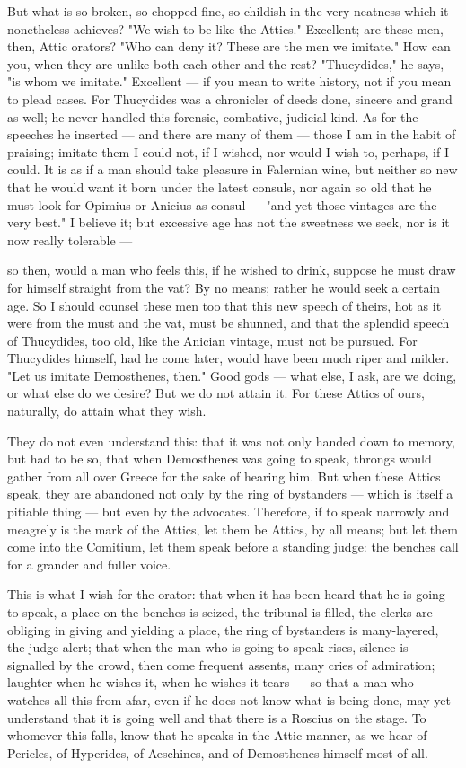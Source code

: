  But what is so broken, so chopped fine, so childish in the very neatness which it nonetheless achieves? "We wish to be like the Attics." Excellent; are these men, then, Attic orators? "Who can deny it? These are the men we imitate." How can you, when they are unlike both each other and the rest? "Thucydides," he says, "is whom we imitate." Excellent — if you mean to write history, not if you mean to plead cases. For Thucydides was a chronicler of deeds done, sincere and grand as well; he never handled this forensic, combative, judicial kind. As for the speeches he inserted — and there are many of them — those I am in the habit of praising; imitate them I could not, if I wished, nor would I wish to, perhaps, if I could. It is as if a man should take pleasure in Falernian wine, but neither so new that he would want it born under the latest consuls, nor again so old that he must look for Opimius or Anicius as consul — "and yet those vintages are the very best." I believe it; but excessive age has not the sweetness we seek, nor is it now really tolerable —

 so then, would a man who feels this, if he wished to drink, suppose he must draw for himself straight from the vat? By no means; rather he would seek a certain age. So I should counsel these men too that this new speech of theirs, hot as it were from the must and the vat, must be shunned, and that the splendid speech of Thucydides, too old, like the Anician vintage, must not be pursued. For Thucydides himself, had he come later, would have been much riper and milder. "Let us imitate Demosthenes, then." Good gods — what else, I ask, are we doing, or what else do we desire? But we do not attain it. For these Attics of ours, naturally, do attain what they wish.

 They do not even understand this: that it was not only handed down to memory, but had to be so, that when Demosthenes was going to speak, throngs would gather from all over Greece for the sake of hearing him. But when these Attics speak, they are abandoned not only by the ring of bystanders — which is itself a pitiable thing — but even by the advocates. Therefore, if to speak narrowly and meagrely is the mark of the Attics, let them be Attics, by all means; but let them come into the Comitium, let them speak before a standing judge: the benches call for a grander and fuller voice.

 This is what I wish for the orator: that when it has been heard that he is going to speak, a place on the benches is seized, the tribunal is filled, the clerks are obliging in giving and yielding a place, the ring of bystanders is many-layered, the judge alert; that when the man who is going to speak rises, silence is signalled by the crowd, then come frequent assents, many cries of admiration; laughter when he wishes it, when he wishes it tears — so that a man who watches all this from afar, even if he does not know what is being done, may yet understand that it is going well and that there is a Roscius on the stage. To whomever this falls, know that he speaks in the Attic manner, as we hear of Pericles, of Hyperides, of Aeschines, and of Demosthenes himself most of all.

